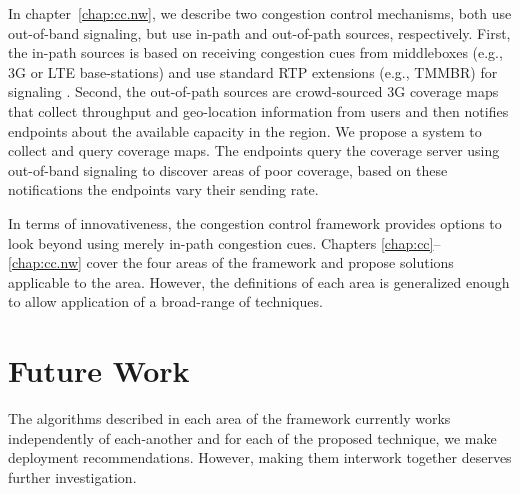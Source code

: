 In chapter~\ref{chap:cc.nw}, we describe two congestion control mechanisms,
both use out-of-band signaling, but use in-path and out-of-path sources,
respectively. First, the in-path sources is based on receiving congestion cues
from middleboxes (e.g., 3G or LTE base-stations) and use standard RTP
extensions (e.g., TMMBR) for signaling . Second, the out-of-path sources are
crowd-sourced 3G coverage maps that collect throughput and geo-location
information from users and then notifies endpoints about the available
capacity in the region. We propose a system to collect and query coverage
maps. The endpoints query the coverage server using out-of-band signaling to
discover areas of poor coverage, based on these notifications the endpoints
vary their sending rate.

In terms of innovativeness, the congestion control framework provides options
to look beyond using merely in-path congestion cues. Chapters
\ref{chap:cc}--\ref{chap:cc.nw} cover the four areas of the framework and
propose solutions applicable to the area. However, the definitions of each
area is generalized enough to allow application of a broad-range of
techniques.


\section{Future Work}

The algorithms described in each area of the framework currently works
independently of each-another and for each of the proposed technique, we make
deployment recommendations. However, making them interwork together deserves
further investigation.